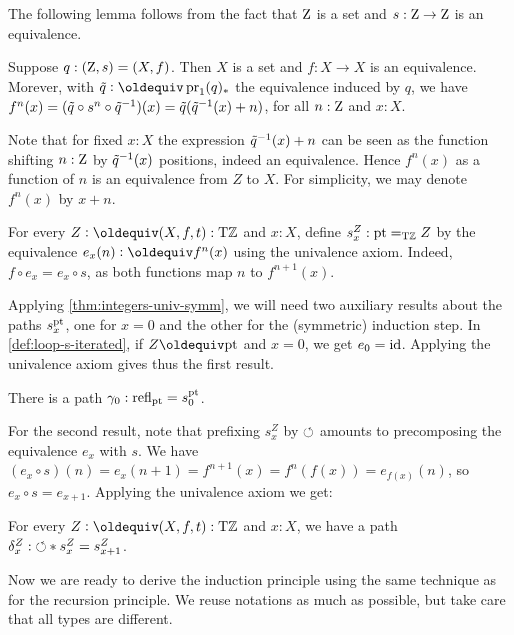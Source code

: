 \documentclass[a4paper,12pt]{amsart}
\begin{document}
The following lemma follows from the fact that $\mathrm{Z}$ is a set
and $s: \mathrm{Z}\to\mathrm{Z}$ is an equivalence.

\begin{lemma}\label{lem:paths-in-TorZ}
  Suppose $q : (\mathrm{Z},s)=(X,f)$.  Then $X$ is a set and $f: X\to X$ is an equivalence.
  Morever, with $\ptoe{q}\defeq \pr_1(q)_*$ the equivalence induced by $q$, we have
  $f^n(x) = (\tilde {q}\circ s^n \circ \tilde {q}^{-1})(x) = \tilde {q}(\tilde {q}^{-1}(x)+n)$,
  for all $n:\mathrm{Z}$ and $x:X$.
\end{lemma}

Note that for fixed $x:X$ the expression $\tilde {q}^{-1}(x)+n$ can be seen as
the function shifting $n:\mathrm{Z}$ by $\tilde {q}^{-1}(x)$ positions, indeed an equivalence.
Hence $f^n(x)$ as a function of $n$ is an equivalence from $Z$ to $X$.
For simplicity, we may denote $f^n(x)$ by $x+n$.

\begin{definition}\label{def:loop-s-iterated}
  For every $Z\defeq(X,f,t):\TorZ$ and $x:X$,
  define $s^Z_x: {\mathord{\mathrm{pt}}} =_{\mathrm{T}\mathbb{Z}} Z$ by the equivalence
  $e_x(n)\defeq f^n(x)$ using the univalence axiom. Indeed,
  $f\circ e_x = e_x \circ s$, as both functions map $n$ to $f^{n+1}(x)$.
\end{definition}

Applying \cref{thm:integers-univ-symm}, we will need two auxiliary
results about the paths $s^{\mathord{\mathrm{pt}}}_x$, one for $x=0$ and
the other for the (symmetric) induction step.
In \cref{def:loop-s-iterated}, if $Z\jdeq\pt$ and $x=0$, we get $e_0 = \mathord{\mathrm{id}}$.
Applying the univalence axiom gives thus the first result.

\begin{lemma}\label{lem:s-pt-zero}
  There is a path $\gamma_0 : \mathop{{\mathrm{refl}}_{{\mathord{\mathrm{pt}}}}} = s^{\mathord{\mathrm{pt}}}_0$.
\end{lemma}

For the second result, note that prefixing $s^Z_x$ by ${{\circlearrowleft}}$
amounts to precomposing the equivalence $e_x$ with $s$.
We have $(e_x\circ s)(n) = e_x(n+1) = f^{n+1}(x) = f^n(f(x)) =e_{f(x)}(n)$,
so $e_x\circ s = e_{x+1}$. Applying the univalence axiom we get:

\begin{lemma}\label{lem:loop-s-iterated}
  For every $Z\defeq(X,f,t):\TorZ$ and $x:X$, we have a path
  ${\delta^Z_x}: {{\circlearrowleft}} * s^Z_x = s^Z_{x+1}$.
\end{lemma}

Now we are ready to derive the induction principle using the same
technique as for the recursion principle. We reuse notations as much as
possible, but take care that all types are different.
\end{document}
